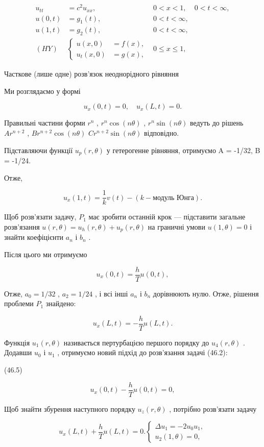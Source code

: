 \documentclass[
  ukrainian,
]{article}
\begin{document}
\[
\begin{aligned} u_{tt} &= c^2 u_{xx}, & 0 < x < 1, & 0 < t < \infty, \\ u(0, t) &= g_1(t), & 0 < t < \infty, \\ u(1, t) &= g_2(t), & 0 < t < \infty, \\ (HY) &\begin{cases} u(x, 0) &= f(x), \\ u_t(x, 0) &= g(x), \end{cases} & 0 \leqslant x \leqslant 1, \end{aligned}
\]

Часткове (лише одне) розв'язок неоднорідного рівняння

Ми розглядаємо у формі

\[
u_x(0, t) = 0, \quad u_x(L, t) = 0.
\]

Правильні частини форми \(r^n\) , \(r^n \cos{(n\theta)}\) ,
\(r^n \sin{(n\theta)}\) ведуть до рішень \(Ar^{n+2}\) ,
\(Br^{n+2} \cos{(n\theta)}\) \(Cr^{n+2} \sin{(n\theta)}\) відповідно.

Підставляючи функції \(u_p(r, \theta)\) у гетерогенне рівняння,
отримуємо A = -1/32, B = -1/24.

Отже,

\[
u_{x}(1, t) = \frac{1}{k} v(t) - (k - \text{модуль Юнга}).
\]

Щоб розв'язати задачу, \(P_1\) має зробити останній крок --- підставити
загальне розв'язання \(u(r, \theta) = u_h(r, \theta) + u_p(r, \theta)\)
на граничні умови \(u(1, \theta) = 0\) і знайти коефіцієнти \(a_n\) і
\(b_n\) .

Після цього ми отримуємо

\[
u_{x}(0, t) = \frac{h}{T} u(0, t),
\]

Отже, \(a_0=1/32\) , \(a_2=1/24\) , і всі інші \(a_n\) і \(b_n\)
дорівнюють нулю. Отже, рішення проблеми \(P_1\) знайдено:

\[
u_{x}(L, t) = -\frac{h}{T} u(L, t).
\]

Функція \(u_1(r, \theta)\) називається пертурбацією першого порядку до
\(u_4(r, \theta)\) . Додавши \(u_0\) і \(u_1\) , отримуємо новий підхід
до розв'язання задачі (46.2):

(46.5)

\[
u_{x}(0, t) - \frac{h}{T}u(0, t) = 0,
\]

Щоб знайти збурення наступного порядку \(u_{z}(r, \theta)\) , потрібно
розв'язати задачу

\[
u_{x}(L, t) + \frac{h}{T}u(L, t) = 0.
\begin{cases} \Delta u_{1} = -2u_{0}u_{1}, \\ u_{2}(1, \theta) = 0, \end{cases}
\]
\end{document}
